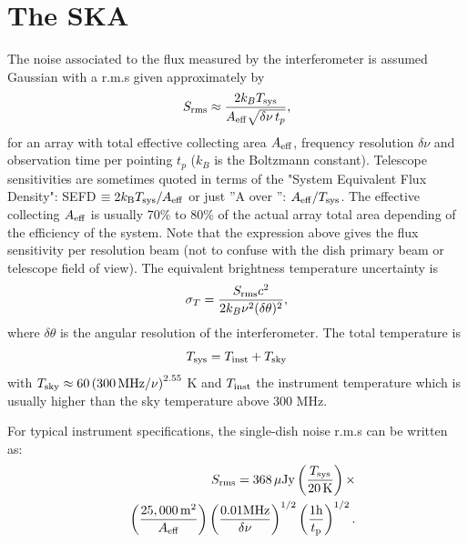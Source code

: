 \documentclass[useAMS,usenatbib]{mn2e}
\newcommand{\be}{\begin{equation}}
\newcommand{\ee}{\end{equation}}
\newcommand{\bea}{\begin{eqnarray}}
\newcommand{\eea}{\end{eqnarray}}
\begin{document}
\section*{The SKA}




The noise associated to the flux measured by the interferometer is assumed Gaussian with a r.m.s given approximately by
\begin{equation}
S_{\rm{rms}} \approx \frac{2 k_B T_{\rm sys}}{A_{\rm eff} \sqrt{\delta\nu\, t_p}},
\end{equation}
for an array with total effective collecting area $A_{\rm eff}$, frequency resolution $\delta\nu$ and observation time per pointing $t_p$ ($k_B$ is the Boltzmann constant). Telescope sensitivities are sometimes quoted in terms of the "System Equivalent Flux Density": SEFD $\equiv 2 k_{\rm B} T_{\rm sys}/A_{\rm eff}$ or just ''A over '': $A_{\rm eff}/T_{\rm sys}$. The effective collecting $A_{\rm eff}$ is usually 70\% to 80\% of the actual array total area depending of the efficiency of the system. Note that the expression above gives the flux sensitivity per resolution beam (not to confuse with the dish primary beam or telescope field of view). The equivalent brightness temperature uncertainty is
\be
\sigma_T= \frac{S_{\rm{rms}} c^2}{2 k_B \nu^2 (\delta\theta)^2},
\ee
where $\delta\theta$ is the angular resolution of the interferometer.
The total temperature is
\begin{equation}
T_{\rm sys}=T_{\rm inst}+T_{\rm sky}
\end{equation}
with $T_{\rm sky}\approx 60 \left(300\, {\rm MHz}/\nu \right)^{2.55}$ K and $T_{\rm inst}$ the instrument temperature which is usually higher than the sky temperature above 300 MHz.

For typical instrument specifications, the single-dish noise r.m.s can be written as:
\bea
\label{rms}
&&S_{\rm{rms}} = 368\, {\rm \mu Jy}\left(\frac{T_{\rm sys}}{20\, \rm K}\right)\times\nonumber\\
&& \left(\frac{25,000\, \rm m^2}{A_{\rm eff}}\right)\left(\frac{0.01 \rm MHz}{\delta\nu}\right)^{1/2}\left(\frac{1 \rm h}{t_{\rm p}}\right)^{1/2}. 
\eea
\end{document}
